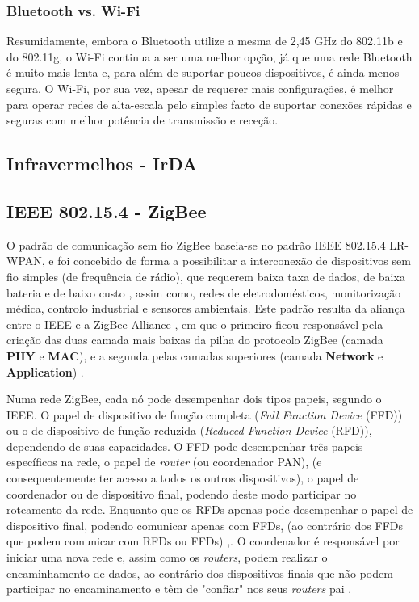 \documentclass[conference]{IEEEtran}
\begin{document}
\subsubsection{Bluetooth vs. Wi-Fi}

Resumidamente, embora o Bluetooth utilize a mesma de 2,45 GHz do 802.11b e do 802.11g, o Wi-Fi continua a ser uma melhor opção, já que uma rede Bluetooth é muito mais lenta e, para além de suportar poucos dispositivos, é ainda menos segura. O Wi-Fi, por sua vez, apesar de requerer mais configurações, é melhor para operar redes de alta-escala pelo simples facto de suportar conexões rápidas e seguras com melhor potência de transmissão e receção.

\subsection{Infravermelhos - IrDA}

\subsection{IEEE 802.15.4 - ZigBee}

O padrão de comunicação sem fio ZigBee baseia-se no padrão IEEE 802.15.4 LR-WPAN, e foi concebido de forma a possibilitar a interconexão de dispositivos sem fio simples (de frequência de rádio), que requerem baixa taxa de dados, de baixa bateria e de baixo custo \cite{kennedy2008review}, assim como, redes de eletrodomésticos, monitorização médica, controlo industrial e sensores ambientais. Este padrão resulta da aliança entre o IEEE e a ZigBee Alliance , em que o primeiro ficou responsável pela criação das duas camada mais baixas da pilha do protocolo ZigBee (camada \textbf{PHY} e \textbf{MAC}), e a segunda pelas camadas superiores (camada \textbf{Network} e \textbf{Application}) \cite{liang2006impact}.

Numa rede ZigBee, cada nó pode desempenhar dois tipos papeis, segundo o IEEE. O papel de dispositivo de função completa (\textit{Full Function Device} (FFD)) ou o de dispositivo de função reduzida (\textit{Reduced Function Device} (RFD)), dependendo de suas capacidades.
O FFD pode desempenhar três papeis específicos na rede, o papel de \textit{router} (ou coordenador PAN), (e consequentemente ter acesso a todos os outros dispositivos), o papel de coordenador ou de dispositivo final, podendo deste modo participar no roteamento da rede.
Enquanto que os RFDs apenas pode desempenhar o papel de dispositivo final, podendo comunicar apenas com FFDs, (ao contrário dos FFDs que podem comunicar com RFDs ou FFDs) \cite{liang2006impact},\cite{sinem2004zigbee}.
O coordenador é responsável por iniciar uma nova rede e, assim como os \textit{routers}, podem realizar o encaminhamento de dados, ao contrário dos dispositivos finais que não podem participar no encaminamento e têm de "confiar" nos seus \textit{routers} pai \cite{liang2006impact}.
\end{document}
